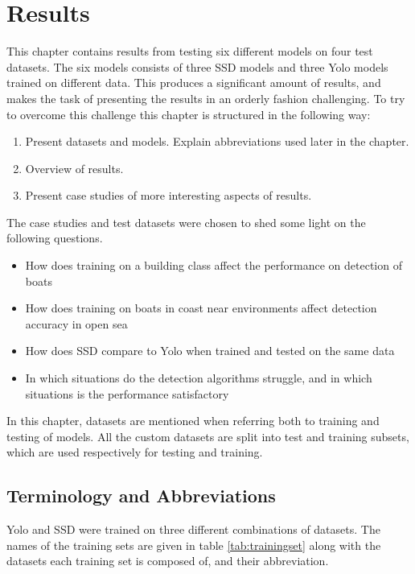 \chapter{Results}
\label{sec:results}

This chapter contains results from testing six different models on four test datasets. The six models consists of three SSD models and three Yolo models trained on different data. This produces a significant amount of results, and makes the task of presenting the results in an orderly fashion challenging. To try to overcome this challenge this chapter is structured in the following way:

\begin{enumerate}
    \item Present datasets and models. Explain abbreviations used later in the chapter.
    \item Overview of results.
    \item Present case studies of more interesting aspects of results.
\end{enumerate}

\noindent
The case studies  and test datasets were chosen to shed some light on the following questions.

\begin{itemize}
    \item How does training on a building class affect the performance on detection of boats
    \item How does training on boats in coast near environments affect detection accuracy in open sea
    \item How does SSD compare to Yolo when trained and tested on the same data
    \item In which situations do the detection algorithms struggle, and in which situations is the performance satisfactory
\end{itemize}

In this chapter, datasets are mentioned when referring both to training and testing of models. All the custom datasets are split into test and training subsets, which are used respectively for testing and training.

\section{Terminology and Abbreviations}
Yolo and SSD were trained on three different combinations of datasets. The names of the training sets are given in table \ref{tab:trainingset} along with the datasets each training set is composed of, and their abbreviation.


